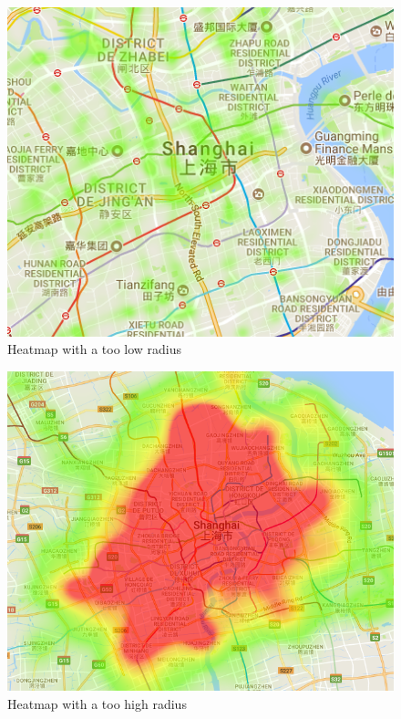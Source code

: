 \documentclass[11pt,conference,a4paper,twocolumns,romanappendices]{IEEEtran}
\begin{document}
\begin{figure}[h]
\centering
\includegraphics[scale=0.45]{zoom_too_low.png}
\caption{\label{fig:zoom1}Heatmap with a too low radius}
\end{figure}

\begin{figure}[h]
\centering
\includegraphics[scale=0.3]{zoom_too_high.png}
\caption{\label{fig:zoom2}Heatmap with a too high radius}
\end{figure}
\end{document}
